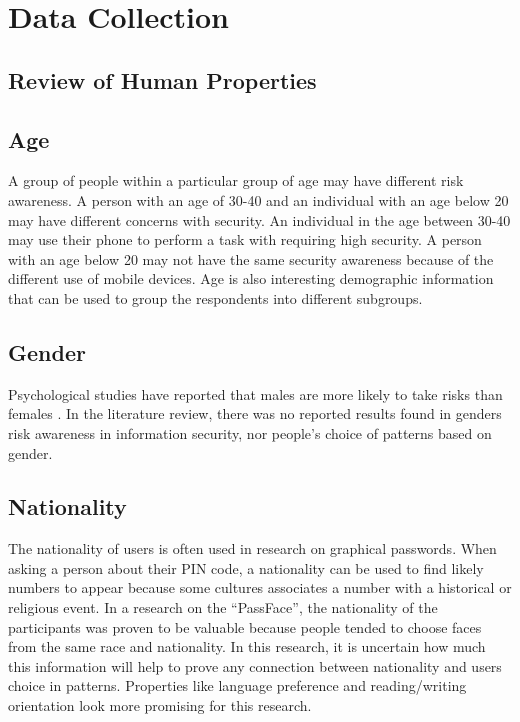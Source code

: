 \section{Data Collection}\label{sec:datacollection}

	\subsection{Review of Human Properties}\label{sec:reviewofproperties}

      
     	\subsection*{Age} 
      A group of people within a particular group of age may have different risk awareness. A person with an age of 30-40 and an individual with an age below 20 may have different concerns with security. An individual in the age between 30-40 may use their phone to perform a task with requiring high security. A person with an age below 20 may not have the same security awareness because of the different use of mobile devices. Age is also interesting demographic information that can be used to group the respondents into different subgroups.

      \subsection*{Gender} 
      Psychological studies have reported that males are more likely to take risks than females \cite{Byrnes}. In the literature review, there was no reported results found in genders risk awareness in information security, nor people's choice of patterns based on gender.

      \subsection*{Nationality} 
      The nationality of users is often used in research on graphical passwords. When asking a person about their PIN code, a nationality can be used to find likely numbers to appear because some cultures associates a number with a historical or religious event. In a research on the ``PassFace'', the nationality of the participants was proven to be valuable because people tended to choose faces from the same race and nationality. In this research, it is uncertain how much this information will help to prove any connection between nationality and users choice in patterns. Properties like language preference and reading/writing orientation look more promising for this research.

